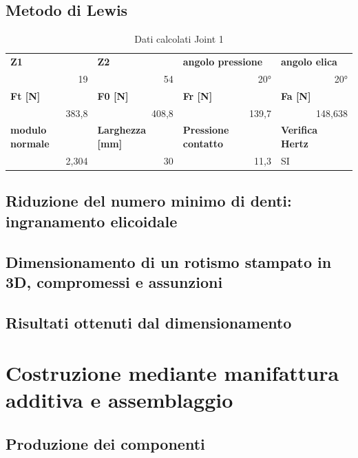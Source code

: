 \documentclass[%
corpo=11pt,
twoside,
 stile=classica,
oldstyle,
greek,%
]{toptesi}
\begin{document}
	\section{Metodo di Lewis}
	\begin{table}[htbp]
		\centering
		\caption{Dati calcolati Joint 1}
		\begin{tabular}{rrrl}
			\multicolumn{1}{l}{\textbf{Z1}} & \multicolumn{1}{l}{\textbf{Z2}} & \multicolumn{1}{l}{\textbf{angolo pressione}} & \textbf{angolo elica} \\
			19    & 54    & 20°    & \multicolumn{1}{r}{20°} \\
			\multicolumn{1}{l}{\textbf{Ft [N]}} & \multicolumn{1}{l}{\textbf{F0 [N]}} & \multicolumn{1}{l}{\textbf{Fr [N]}} & \textbf{Fa [N]} \\
			383,8 & 408,8 & 139,7 & \multicolumn{1}{r}{148,638} \\
			\multicolumn{1}{l}{\textbf{modulo normale}} & \multicolumn{1}{l}{\textbf{Larghezza [mm]}} & \multicolumn{1}{l}{\textbf{Pressione contatto}} & \textbf{Verifica Hertz} \\
			2,304 & 30    & 11,3  & SI \\
		\end{tabular}%
		\label{tab:lewis1}%
	\end{table}%
	
	\section{Riduzione del numero minimo di denti: ingranamento elicoidale}
	\section{Dimensionamento di un rotismo stampato in 3D, compromessi e assunzioni}
	\section{Risultati ottenuti dal dimensionamento}
	

\chapter{Costruzione mediante manifattura additiva e assemblaggio}

	\section{Produzione dei componenti}
\end{document}
